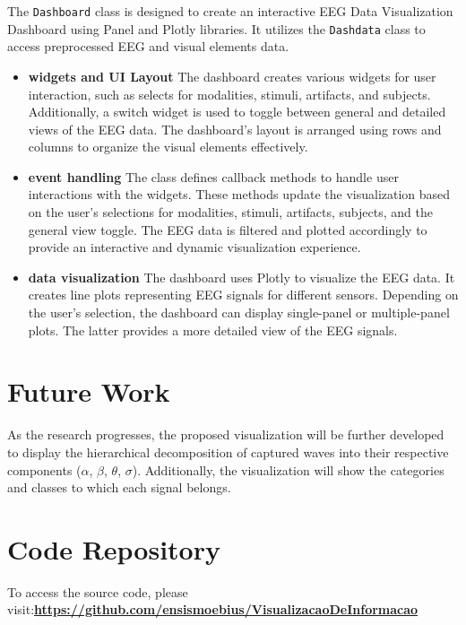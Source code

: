 \documentclass[format=sigconf]{acmart}
\begin{document}
			\par The \texttt{Dashboard} class is designed to create an interactive EEG Data Visualization Dashboard using Panel and Plotly libraries. It utilizes the \texttt{Dashdata} class to access preprocessed EEG and visual elements data.
			
			\begin{itemize}
				\item{\textbf{widgets and UI Layout}} The dashboard creates various widgets for user interaction, such as selects for modalities, stimuli, artifacts, and subjects. Additionally, a switch widget is used to toggle between general and detailed views of the EEG data. The dashboard's layout is arranged using rows and columns to organize the visual elements effectively.
				
				\item{\textbf{event handling}} The class defines callback methods to handle user interactions with the widgets. These methods update the visualization based on the user's selections for modalities, stimuli, artifacts, subjects, and the general view toggle. The EEG data is filtered and plotted accordingly to provide an interactive and dynamic visualization experience.
				
				\item{\textbf{data visualization}} The dashboard uses Plotly to visualize the EEG data. It creates line plots representing EEG signals for different sensors. Depending on the user's selection, the dashboard can display single-panel or multiple-panel plots. The latter provides a more detailed view of the EEG signals.
			\end{itemize}
			
	\section{Future Work}
		\par As the research progresses, the proposed visualization will be further developed to display the hierarchical decomposition of captured waves into their respective components ($\alpha$, $\beta$, $\theta$, $\sigma$). Additionally, the visualization will show the categories and classes to which each signal belongs.
	
	\section{Code Repository}
	\par To access the source code, please visit:\newline \href{https://github.com/ensismoebius/VisualizacaoDeInformacao}{\textbf{https://github.com/ensismoebius/VisualizacaoDeInformacao}}
	
\end{document}
